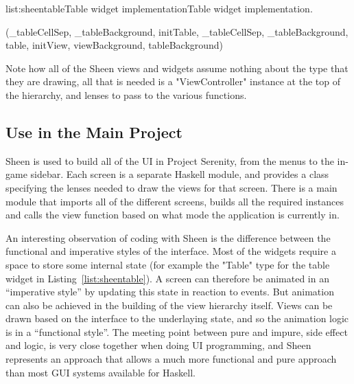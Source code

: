 \vspace{-0.5em}
\begin{listing}{list:sheentable}{Table widget implementation}{Table widget implementation.}{}
\end{listing}\vspace{-1.5em}

\functions(_tableCellSep, _tableBackground, initTable, _tableCellSep, _tableBackground, table, initView, viewBackground, tableBackground)
\noindent 
Note how all of the Sheen views and widgets assume nothing about the type that they are drawing, all that is needed is a "ViewController" instance at the top of the hierarchy, and lenses to pass to the various functions. 

\subsection{Use in the Main Project}

Sheen is used to build all of the UI in Project Serenity, from the menus to the in-game sidebar. Each screen is a separate Haskell module, and provides a class specifying the lenses needed to draw the views for that screen. There is a main module that imports all of the different screens, builds all the required instances and calls the view function based on what mode the application is currently in.

An interesting observation of coding with Sheen is the difference between the functional and imperative styles of the interface. Most of the widgets require a space to store some internal state (for example the "Table" type for the table widget in Listing~\ref{list:sheentable}). A screen can therefore be animated in an ``imperative style'' by updating this state in reaction to events. But animation can also be achieved in the building of the view hierarchy itself. Views can be drawn based on the interface to the underlaying state, and so the animation logic is in a ``functional style''. The meeting point between pure and impure, side effect and logic, is very close together when doing UI programming, and Sheen represents an approach that allows a much more functional and pure approach than most GUI systems available for Haskell.

